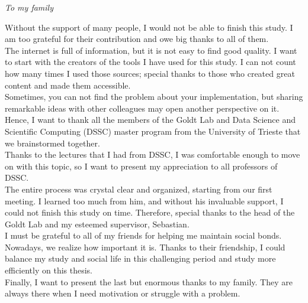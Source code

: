 \documentclass[a4paper, nobind]{templates/ociamthesis}
\begin{document}
\begin{romanpages}



\begin{dedication}
  \emph{To my family}
\end{dedication}

\begin{acknowledgements}
 	Without the support of many people, I would not be able to finish this study. I am too grateful for their contribution and owe big thanks to all of them.\\
The internet is full of information, but it is not easy to find good quality. I want to start with the creators of the tools I have used for this study. I can not count how many times I used those sources; special thanks to those who created great content and made them accessible.\\
Sometimes, you can not find the problem about your implementation, but sharing remarkable ideas with other colleagues may open another perspective on it. Hence, I want to thank all the members of the Goldt Lab and Data Science and Scientific Computing (DSSC) master program from the University of Trieste that we brainstormed together.\\
Thanks to the lectures that I had from DSSC, I was comfortable enough to move on with this topic, so I want to present my appreciation to all professors of DSSC.\\
The entire process was crystal clear and organized, starting from our first meeting. I learned too much from him, and without his invaluable support, I could not finish this study on time. Therefore, special thanks to the head of the Goldt Lab and my esteemed supervisor, Sebastian.\\
I must be grateful to all of my friends for helping me maintain social bonds. Nowadays, we realize how important it is. Thanks to their friendship, I could balance my study and social life in this challenging period and study more efficiently on this thesis.\\
Finally, I want to present the last but enormous thanks to my family. They are always there when I need motivation or struggle with a problem.


\end{acknowledgements}
\end{romanpages}
\end{document}
